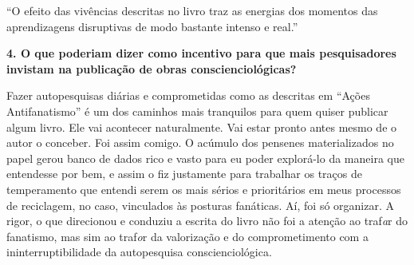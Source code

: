 \documentclass{gescons}
\begin{document}
\begin{multicols}{2}
\begin{pullquote}
``O efeito das vivências descritas no livro traz as energias dos momentos das aprendizagens disruptivas de modo bastante intenso e real.''
\end{pullquote}


\textbf{4.       O que poderiam dizer como incentivo para que mais pesquisadores invistam na publicação de obras conscienciológicas?}

Fazer autopesquisas diárias e comprometidas como as descritas em “Ações Antifanatismo” é um dos caminhos mais tranquilos para quem quiser publicar algum livro. Ele vai acontecer naturalmente. Vai estar pronto antes mesmo de o autor o conceber. Foi assim comigo. O acúmulo dos pensenes materializados no papel gerou banco de dados rico e vasto para eu poder explorá-lo da maneira que entendesse por bem, e assim o fiz justamente para trabalhar os traços de temperamento que entendi serem os mais sérios e prioritários em meus processos de reciclagem, no caso, vinculados às posturas fanáticas. Aí, foi só organizar. A rigor, o que direcionou e conduziu a escrita do livro não foi a atenção ao traf\textit{a}r do fanatismo, mas sim ao traf\textit{o}r da valorização e do comprometimento com a ininterruptibilidade da autopesquisa conscienciológica.


    
    
    \end{multicols}
\end{document}
